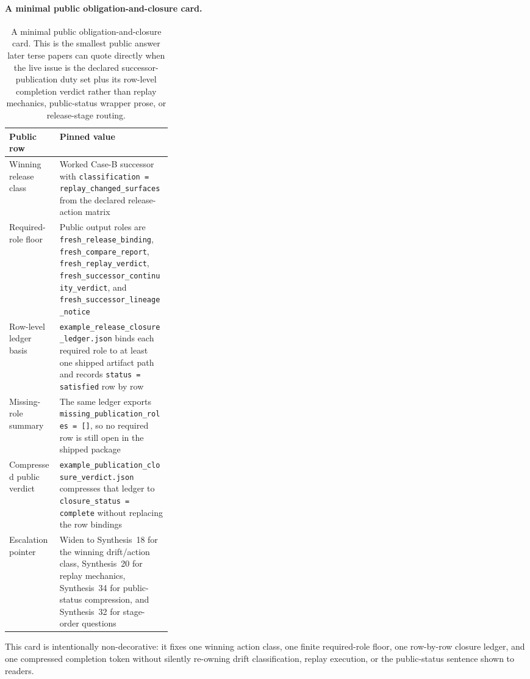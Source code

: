 \documentclass[11pt]{article}
\begin{document}
\paragraph{A minimal public obligation-and-closure card.}
\begin{table}[t]
\centering
\small
\begin{tabularx}{0.97\linewidth}{@{}p{0.31\linewidth}X@{}}
\toprule
\textbf{Public row} & \textbf{Pinned value}\\
\midrule
Winning release class & Worked Case-B successor with \texttt{classification = replay\_changed\_surfaces} from the declared release-action matrix \\
Required-role floor & Public output roles are \texttt{fresh\_release\_binding}, \texttt{fresh\_compare\_report}, \texttt{fresh\_replay\_verdict}, \texttt{fresh\_successor\_continuity\_verdict}, and \texttt{fresh\_successor\_lineage\_notice} \\
Row-level ledger basis & \texttt{example\_release\_closure\_ledger.json} binds each required role to at least one shipped artifact path and records \texttt{status = satisfied} row by row \\
Missing-role summary & The same ledger exports \texttt{missing\_publication\_roles = []}, so no required row is still open in the shipped package \\
Compressed public verdict & \texttt{example\_publication\_closure\_verdict.json} compresses that ledger to \texttt{closure\_status = complete} without replacing the row bindings \\
Escalation pointer & Widen to Synthesis~18 for the winning drift/action class, Synthesis~20 for replay mechanics, Synthesis~34 for public-status compression, and Synthesis~32 for stage-order questions \\
\bottomrule
\end{tabularx}
\caption{A minimal public obligation-and-closure card. This is the smallest public answer later terse papers can quote directly when the live issue is the declared successor-publication duty set plus its row-level completion verdict rather than replay mechanics, public-status wrapper prose, or release-stage routing.}
\label{tab:minimal-obligation-closure-card}
\end{table}

This card is intentionally non-decorative: it fixes one winning action class, one finite required-role floor, one row-by-row closure ledger, and one compressed completion token without silently re-owning drift classification, replay execution, or the public-status sentence shown to readers.\cite{series:workedexample}
\end{document}
